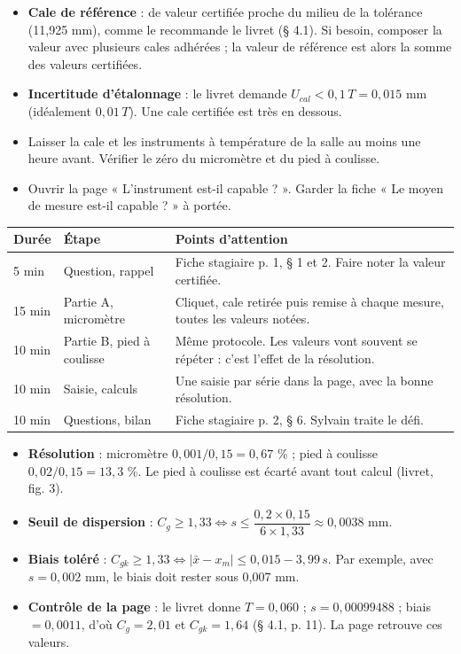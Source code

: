 \documentclass[10pt,a4paper]{article}
\begin{document}
\thispagestyle{fancy}

\begin{itemize}
\item \textbf{Cale de référence} : de valeur certifiée proche du milieu de la tolérance (11,925 mm), comme le recommande le livret (§ 4.1). Si besoin, composer la valeur avec plusieurs cales adhérées ; la valeur de référence est alors la somme des valeurs certifiées.
\item \textbf{Incertitude d'étalonnage} : le livret demande $U_{cal} < 0{,}1\,T = 0{,}015$ mm (idéalement $0{,}01\,T$). Une cale certifiée est très en dessous.
\item Laisser la cale et les instruments à température de la salle au moins une heure avant. Vérifier le zéro du micromètre et du pied à coulisse.
\item Ouvrir la page « L'instrument est-il capable ? ». Garder la fiche « Le moyen de mesure est-il capable ? » à portée.
\end{itemize}

\renewcommand{\arraystretch}{1.25}
\begin{tabularx}{\linewidth}{@{}l l X@{}}
\toprule
\textbf{Durée} & \textbf{Étape} & \textbf{Points d'attention}\\\midrule
5 min & Question, rappel & Fiche stagiaire p. 1, § 1 et 2. Faire noter la valeur certifiée.\\
15 min & Partie A, micromètre & Cliquet, cale retirée puis remise à chaque mesure, toutes les valeurs notées.\\
10 min & Partie B, pied à coulisse & Même protocole. Les valeurs vont souvent se répéter : c'est l'effet de la résolution.\\
10 min & Saisie, calculs & Une saisie par série dans la page, avec la bonne résolution.\\
10 min & Questions, bilan & Fiche stagiaire p. 2, § 6. Sylvain traite le défi.\\
\bottomrule
\end{tabularx}

\begin{itemize}
\item \textbf{Résolution} : micromètre $0{,}001/0{,}15 = 0{,}67$ \% ; pied à coulisse $0{,}02/0{,}15 = 13{,}3$ \%. Le pied à coulisse est écarté avant tout calcul (livret, fig. 3).
\item \textbf{Seuil de dispersion} : $C_g \ge 1{,}33 \iff s \le \dfrac{0{,}2 \times 0{,}15}{6 \times 1{,}33} \approx 0{,}0038$ mm.
\item \textbf{Biais toléré} : $C_{gk} \ge 1{,}33 \iff \lvert\bar x - x_m\rvert \le 0{,}015 - 3{,}99\,s$. Par exemple, avec $s = 0{,}002$ mm, le biais doit rester sous 0,007 mm.
\item \textbf{Contrôle de la page} : le livret donne $T = 0{,}060$ ; $s = 0{,}00099488$ ; biais $= 0{,}0011$, d'où $C_g = 2{,}01$ et $C_{gk} = 1{,}64$ (§ 4.1, p. 11). La page retrouve ces valeurs.
\end{itemize}
\end{document}
